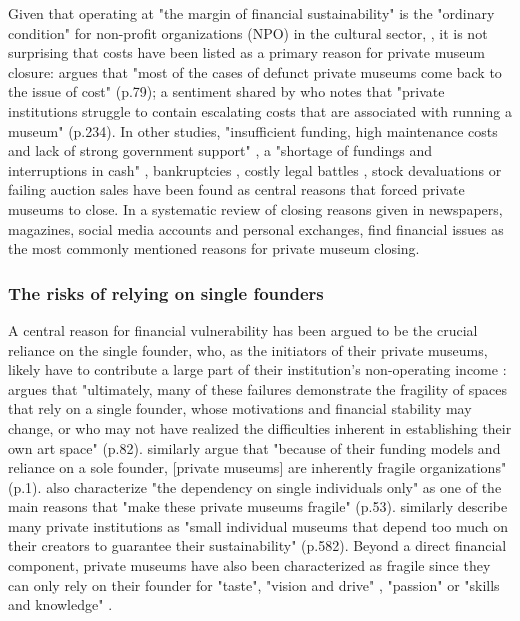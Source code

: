 \documentclass[12pt]{article}
\begin{document}
Given that operating at "the margin of financial sustainability" is the "ordinary condition" for non-profit organizations (NPO) in the cultural sector, \parencite[p.2]{Licci_BaraldiBonini_2024_sustainability}, it is not surprising that costs have been listed as a primary reason for private museum closure:
\textcite{Adam_2021_rise} argues that "most of the cases of defunct private museums come back to the issue of cost" (p.79); a sentiment shared by \textcite{Walker_2019_collector} who notes that "private institutions struggle to contain escalating costs that are associated with running a museum" (p.234).
In other studies, "insufficient funding, high maintenance costs and lack of strong government support" \parencite[p.7]{Zennaro_2017_shanghai}, a "shortage of fundings and interruptions in cash" \parencite[p.45]{Song_2008_private}, bankruptcies \parencite{Velthuis_Gera_2024_fragility,DeNigris_2018_museums}, costly legal battles \parencite{Velthuis_Gera_2024_fragility}, stock devaluations \parencite{Walker_2019_collector} or failing auction sales \parencite{Bechtler_Imhof_2018_future} have been found as central reasons that forced private museums to close.
In a systematic review of closing reasons given in newspapers, magazines, social media accounts and personal exchanges, \textcite{Velthuis_Gera_2024_fragility} find financial issues as the most commonly mentioned reasons for private museum closing.
\subsubsection*{The risks of relying on single founders}




A central reason for financial vulnerability has been argued to be the crucial reliance on the single founder, who, as the initiators of their private museums, likely have to contribute a large part of their institution's non-operating income \parencite{Frey_Meier_2002_beyeler}:
\textcite{Adam_2021_rise} argues that "ultimately, many of these failures demonstrate the fragility of spaces that rely on a single founder, whose motivations and financial stability may change, or who may not have realized the difficulties inherent in establishing their own art space" (p.82).
\textcite{Velthuis_Gera_2024_fragility} similarly argue that "because of their funding models and reliance on a sole founder, [private museums] are inherently fragile organizations" (p.1).
\textcite{Bechtler_Imhof_2018_future} also characterize "the dependency on single individuals only" as one of the main reasons that "make these private museums fragile" (p.53).
\textcite{StylianouLambert_etal_2014_museums} similarly describe many private institutions as "small individual museums that depend too much on their creators to guarantee their sustainability" (p.582).
Beyond a direct financial component, private museums have also been characterized as fragile since they can only rely on their founder for "taste", "vision and drive" \parencite[p.77]{Adam_2021_rise}, "passion" \parencite[p.234]{Walker_2019_collector} or "skills and knowledge" \parencite[p.580]{StylianouLambert_etal_2014_museums}.
\end{document}
